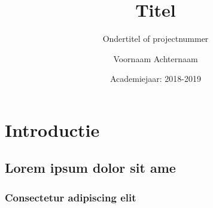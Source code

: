 \documentclass[12pt, a4paper, oneside]{ugentarticle}
\title{Titel}
\subtitle{Ondertitel of projectnummer}
\author{Voornaam Achternaam}
\date{Academiejaar: 2018-2019}
\begin{document}
	\maketitle
	\tableofcontents\newpage
	
	\chapter{Introductie}
	
	\section{Lorem ipsum dolor sit ame}
	
	\lipsum[1]
	
	\subsection{Consectetur adipiscing elit}
	
	\lipsum[2-6]
\end{document}
